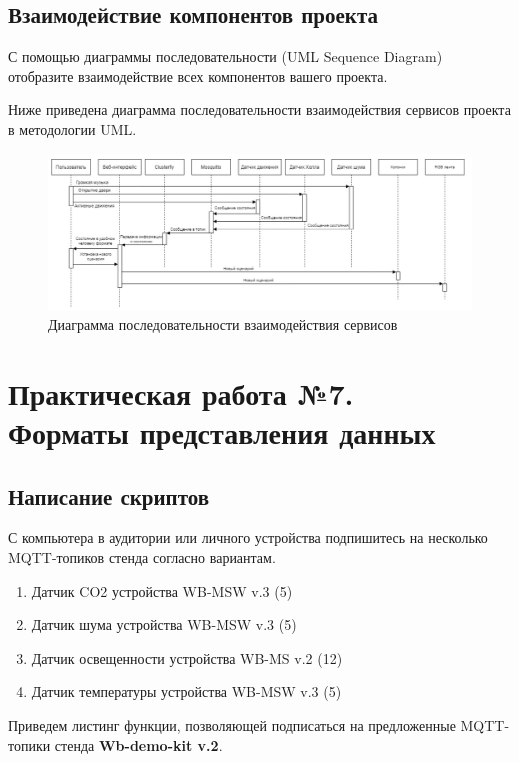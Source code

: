 \documentclass[a4paper,14pt]{extarticle}
\newcommand{\stend}{\textbf{Wb-demo-kit v.2}}
\begin{document}
\subsection{Взаимодействие компонентов проекта}
\begin{problem}
	
	С помощью диаграммы последовательности (UML Sequence Diagram) отобразите
	взаимодействие всех компонентов вашего проекта. 
	
	\nonum
	Ниже приведена диаграмма последовательности взаимодействия сервисов проекта в методологии UML.
	\begin{figure}[htpb]
		\centering
		\includegraphics[width=0.7\linewidth]{images/sql-6}
		\caption{Диаграмма последовательности взаимодействия сервисов}
		\label{fig:sql-6}
	\end{figure}
\end{problem}

\newpage

\section{Практическая работа №7.\\ Форматы представления данных }

\subsection{Написание скриптов}
\begin{problem}
	С компьютера в аудитории или личного устройства подпишитесь на несколько
	MQTT-топиков стенда согласно вариантам.
	\begin{enumerate}
		\item Датчик CO2 устройства WB-MSW v.3 (5)
		\item Датчик шума устройства WB-MSW v.3 (5)
		\item Датчик освещенности устройства WB-MS v.2 (12)
		\item Датчик температуры устройства WB-MSW v.3 (5)
	\end{enumerate}
	\nonum Приведем листинг функции, позволяющей подписаться на предложенные MQTT-топики стенда \stend.




\end{problem}
\end{document}
